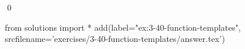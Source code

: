 
\begin{ex}
  \label{ex:3-40-function-templates}
  
  \qed
\end{ex}
\begin{python0}
from solutions import *
add(label="ex:3-40-function-templates",
    srcfilename='exercises/3-40-function-templates/answer.tex')
\end{python0}
